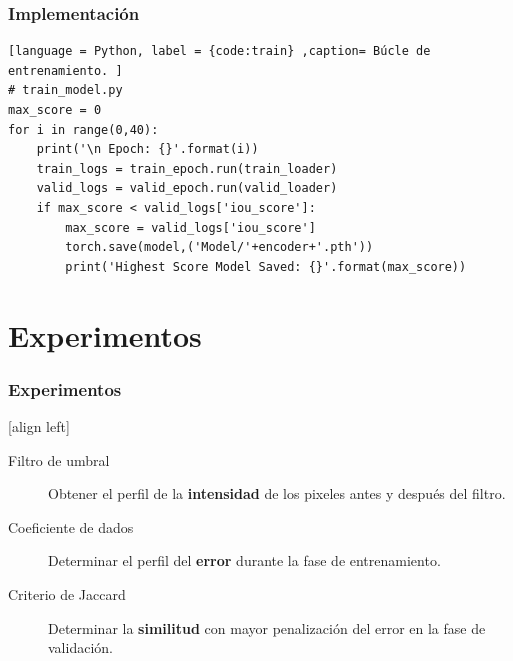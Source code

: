 \documentclass{beamer}
\begin{document}
\begin{frame}[fragile]
\frametitle{Implementación}
\begin{lstlisting}[language = Python, label = {code:train} ,caption= Búcle de entrenamiento. ]
# train_model.py
max_score = 0 
for i in range(0,40):
    print('\n Epoch: {}'.format(i))
    train_logs = train_epoch.run(train_loader)
    valid_logs = valid_epoch.run(valid_loader)
    if max_score < valid_logs['iou_score']:
        max_score = valid_logs['iou_score']
        torch.save(model,('Model/'+encoder+'.pth'))
        print('Highest Score Model Saved: {}'.format(max_score))
\end{lstlisting}
\end{frame}

\section{Experimentos}

\begin{frame}
    \frametitle{Experimentos}
    [align left]
    \begin{description}
        \item[Filtro de umbral] Obtener el perfil de la \textbf{intensidad} de los pixeles antes y después del filtro.
        \item[Coeficiente de dados] Determinar el perfil del \textbf{error} durante la fase de entrenamiento.
        \item[Criterio de Jaccard] Determinar la \textbf{similitud} con mayor penalización del error en la fase de validación.   
    \end{description}
\end{frame}
\end{document}
